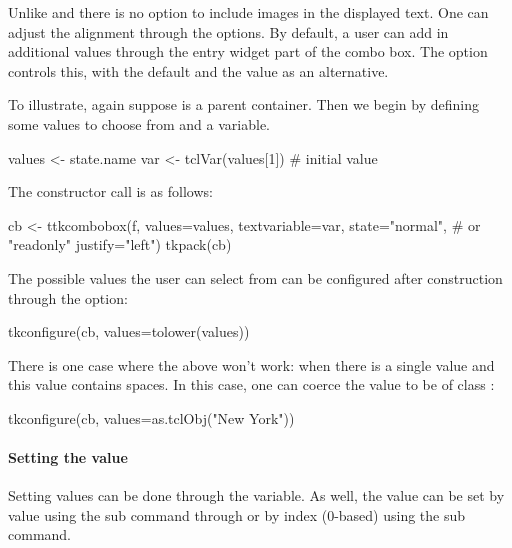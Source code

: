 Unlike \GTK{} and \Qt{} there is no option to include images in the
displayed text. One can adjust the alignment through the
 options.  By default, a user can add in
additional values through the entry widget part of the combo box. The
 option controls this, with the default
 and the value  as an alternative.

To illustrate, again suppose  is a parent container. Then we
begin by defining some values to choose from and a \TCL\/ variable.


\begin{Schunk}
\begin{Sinput}
 values <- state.name
 var <- tclVar(values[1])              # initial value
\end{Sinput}
\end{Schunk}

The constructor call is as follows:
\begin{Schunk}
\begin{Sinput}
 cb <- ttkcombobox(f,
                   values=values,
                   textvariable=var,
                   state="normal",     # or "readonly"
                   justify="left")
 tkpack(cb)
\end{Sinput}
\end{Schunk}


The possible values the user can select from can be configured after
construction through the  option:
\begin{Schunk}
\begin{Sinput}
 tkconfigure(cb, values=tolower(values))
\end{Sinput}
\end{Schunk}

There is one case where the above won't work: when there is a single
value and this value contains spaces. In this case, one can coerce the
value to be of class :
\begin{Schunk}
\begin{Sinput}
 tkconfigure(cb, values=as.tclObj("New York"))
\end{Sinput}
\end{Schunk}

\paragraph{Setting the value}
Setting values can be done through the \TCL\/ variable. As well, the
value can be set by value using the  sub
command through  or by index (0-based) using the
 sub command.

